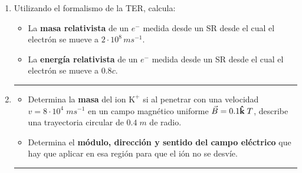 \documentclass[a4paper,14pt]{exam}
\DeclareRobustCommand{\uvec}[1]{{%
 	 \ifcsname uvec#1\endcsname
  	   \csname uvec#1\endcsname
  	 \else
   		 \bm{\hat{\mathbf{#1}}}%
   		\fi
									}}
\newcommand*\chem[1]{\ensuremath{\mathrm{#1}}}
\newcommand{\halmos}{\vspace*{-6mm}
	
					\begin{flushright}
						\rule{1mm}{2.5mm} 
					\end{flushright}\vspace*{-8mm}
						
					  }
\renewcommand{\qed}{\halmos}
\begin{document}
\begin{enumerate}
\vspace{1ex}
	
	\item Utilizando el formalismo de la {\small TER}, calcula:
	\begin{itemize}
			\item[a)] La \textbf{masa relativista} de un $e^-$ medida desde un {\small SR}  desde el cual el electrón se mueve a $2\cdot 10^8\,ms^{-1}$.
			\item[b)] La \textbf{energía relativista} de un $e^-$ medida desde un {\small SR}  desde el cual el electrón se mueve a $0.8c$.
		\end{itemize}
	\qed
\vspace{1ex}
	
	
	\item
		\begin{itemize} 
			\item[a)] Determina la \textbf{masa} del ion  \chem{K^+} si al penetrar con una velocidad $v=8\cdot 10^4\; ms^{-1}$ en un campo magnético uniforme $\vec B=0.1\uvec{k}\;T$, describe una trayectoria circular de $0.4\; m$  de radio.
			\item[b)] Determina el \textbf{módulo, dirección y sentido del campo eléctrico} que hay que aplicar en esa región para que el ión no se desvíe. 
		\end{itemize}
	\qed
			

\end{enumerate}
\end{document}
